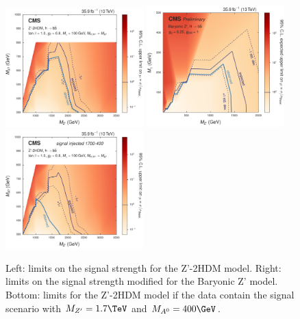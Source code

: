 \begin{figure}[htbp]
   \centering
   \includegraphics[width=0.475\textwidth]{figures/limits/limits_2hdm2d.png}
   \includegraphics[width=0.475\textwidth]{figures/limits/limits_barzp2d.png}\\
   \includegraphics[width=0.475\textwidth]{figures/limits/limits_2hdm_siginj.png}
   \caption{Left: limits on the signal strength for the Z'-2HDM model. Right: limits on the signal strength modified for the Baryonic Z' model. Bottom: limits for the Z'-2HDM model if the data contain the signal scenario with $M_{Z'}=1.7\TeV$ and $M_{A^0}=400\GeV$.}
   \label{fig:limits}
\end{figure}

